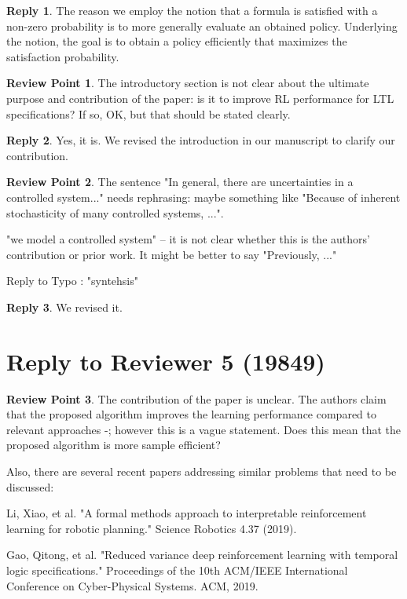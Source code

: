 \documentclass[10 pt, dvipdfmx]{article}
\theoremstyle{definition}
\newtheorem{review point}{Review Point}[section]
\newtheorem*{reply}{Reply}
\begin{document}
\begin{reply}
  The reason we employ the notion that a formula is satisfied with a non-zero probability is to more generally evaluate an obtained policy. Underlying the notion, the goal is to obtain a policy efficiently that maximizes the satisfaction probability.
\end{reply}

\begin{review point}
  The introductory section is not clear about the ultimate purpose and
contribution of the paper: is it to improve RL performance for LTL
specifications? If so, OK, but that should be stated clearly.
\end{review point}

\begin{reply}
  Yes, it is. We revised the introduction in our manuscript to clarify our contribution.
\end{reply}

\begin{review point}
  The sentence "In general, there are uncertainties in a controlled
system..." needs rephrasing: maybe something like "Because of inherent
stochasticity of many controlled systems, ...".

"we model a controlled system" -- it is not clear whether this is the
authors' contribution or prior work. It might be better to say
"Previously, ..."

Reply to Typo : "syntehsis"
\end{review point}

\begin{reply}
  We revised it.
\end{reply}

\section{Reply to Reviewer 5 (19849)}

\begin{review point}
  The contribution of the paper is unclear. The authors claim that the
proposed algorithm improves the learning performance compared to
relevant approaches \cite{Hahn2019}-\cite{BWZP2019}; however this is a vague statement. Does
this mean that the proposed algorithm is more sample efficient?

Also, there are several recent papers addressing similar problems that
need to be discussed:

Li, Xiao, et al. "A formal methods approach to interpretable
reinforcement learning for robotic planning." Science Robotics 4.37
(2019).

Gao, Qitong, et al. "Reduced variance deep reinforcement learning with
temporal logic specifications." Proceedings of the 10th ACM/IEEE
International Conference on Cyber-Physical Systems. ACM, 2019.
\end{review point}
\end{document}
